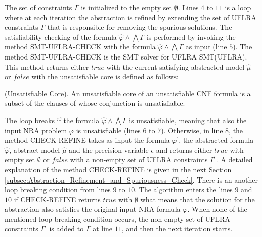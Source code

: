 \noindent The set of constraints $\Gamma$ is initialized to the empty set $\emptyset$.
Lines $4$ to $11$ is a loop where at each iteration the abstraction is refined by extending the set of UFLRA constraints $\Gamma$ that is responsible for removing the spurious solutions.
The satisfiability checking of the formula $\hat{\varphi} \wedge \bigwedge \Gamma$ is performed by invoking the method SMT-UFLRA-CHECK with the formula $\hat{\varphi} \wedge \bigwedge \Gamma$ as input (line $5$).
The method SMT-UFLRA-CHECK is the SMT solver for UFLRA SMT(UFLRA).
This method returns either $true$ with the current satisfying abstracted model $\hat{\mu}$ or $false$ with the unsatisfiable core is defined as follows:\newline

\begin{definition}
    (Unsatisfiable Core).
    An unsatisfiable core of an unsatisfiable CNF formula is a subset of the clauses of whose conjunction is unsatisfiable.
 \end{definition}

\noindent The loop breaks if the formula $\hat{\varphi} \wedge \bigwedge \Gamma$ is unsatisfiable, meaning that also the input NRA problem $\varphi$ is unsatisfiable (lines $6$ to $7$).
Otherwise, in line $8$, the method CHECK-REFINE takes as input the formula $\varphi^{\prime}$, the abstracted formula $\hat{\varphi}$, abstract model $\hat{\mu}$ and the precision variable $\epsilon$ and returns either $true$ with empty set $\emptyset$ or $false$ with a non-empty set of UFLRA constraints $\Gamma^{\prime}$.
A detailed explanation of the method CHECK-REFINE is given in the next Section \ref{subsec:Abstraction_Refinement_and_Spuriousness_Check}. 
There is an another loop breaking condition from lines $9$ to $10$.
The algorithm enters the lines $9$ and $10$ if CHECK-REFINE returns $true$ with $\emptyset$ what means that the solution for the abstraction also satisfies the original input NRA formula $\varphi$.
When none of the mentioned loop breaking condition occurs, the non-empty set of UFLRA constraints $\Gamma^{\prime}$ is added to $\Gamma$ at line $11$, and then the next iteration starts.
